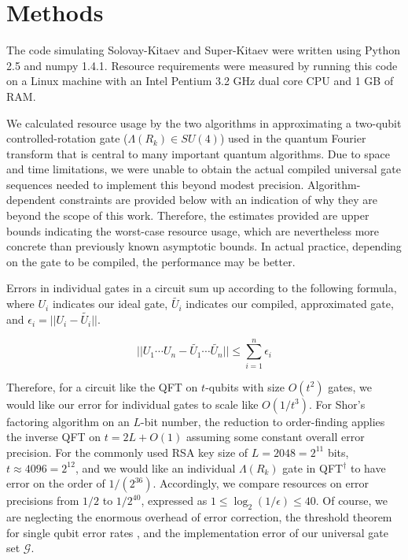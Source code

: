 \section{Methods}
\label{sec:methods}

The code simulating Solovay-Kitaev and 
Super-Kitaev were written using Python 2.5 and numpy 1.4.1.
Resource requirements were measured by running this code on
a Linux machine with an Intel Pentium 3.2 GHz dual core CPU and 1 GB of RAM.

We calculated resource usage by the two algorithms in approximating a
two-qubit
controlled-rotation gate ($\Lambda(R_k) \in SU(4)$) used in the quantum Fourier
transform that is central to many important quantum algorithms.
Due to space and time limitations, we were unable to obtain the actual
compiled universal gate
sequences needed to implement this beyond modest precision.
Algorithm-dependent constraints are provided below with an indication of
why they are beyond the scope of this work.
Therefore, the estimates provided are upper bounds indicating
the worst-case resource usage, which are nevertheless more concrete than
previously known asymptotic bounds. In actual practice, depending on the gate
to be compiled, the performance may be better.

Errors in individual gates in a circuit sum up according to the following
formula, where $U_i$ indicates our ideal gate, $\tilde{U_i}$ indicates our
compiled, approximated gate, and $\epsilon_i  = || U_i - \tilde{U_i} ||$.

\begin{displaymath}
|| U_1\cdots U_n - \tilde{U_1}\cdots\tilde{U_n} || \le \sum_{i=1}^n \epsilon_i
\end{displaymath}

Therefore, for a circuit like the QFT on $t$-qubits with size $O(t^2)$ gates,
we would like our error for individual gates to scale like $O(1/t^3)$.
For Shor's factoring algorithm on an $L$-bit number, the reduction to
order-finding applies the inverse QFT on $t = 2L + O(1)$ assuming some constant
overall error precision. For the commonly used RSA key size of
$L = 2048 = 2^11$ bits, $t \approx 4096 = 2^12$, and we would like an individual
$\Lambda(R_k)$ gate in QFT$^{\dag}$ to have error on the order of
$1/(2^36)$. Accordingly, we compare resources on error precisions from
$1/2$ to $1/2^40$, expressed as $1 \le \log_2(1/\epsilon) \le 40$. Of course,
we are neglecting the enormous overhead of error correction, the threshold
theorem for single qubit error rates \cite{nc00}, and the implementation error
of our universal gate set $\mathcal{G}$.

